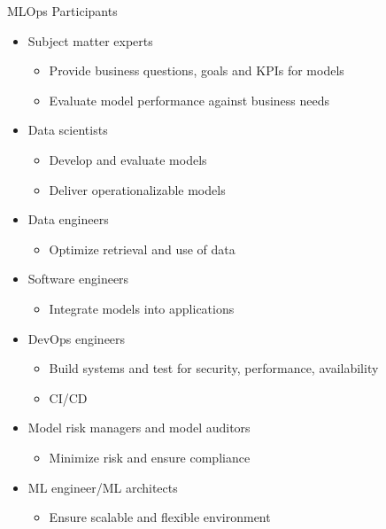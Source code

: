 \documentclass[ignorenonframetext,xcolor=x11names]{beamer}
\begin{document}
\begin{frame}[label=full]{MLOps Participants}
\begin{itemize}
  \item Subject matter experts
  \begin{itemize}
  \footnotesize
     \item Provide business questions, goals and KPIs for models
     \item Evaluate model performance against business needs
  \end{itemize}
  \item Data scientists
  \begin{itemize}
  \footnotesize
     \item Develop and evaluate models
     \item Deliver operationalizable models
  \end{itemize}
  \item Data engineers
  \begin{itemize}
  \footnotesize
      \item Optimize retrieval and use of data
  \end{itemize}
  \item Software engineers
  \begin{itemize}
  \footnotesize
      \item Integrate models into applications
  \end{itemize}
  \item DevOps engineers
  \begin{itemize}
  \footnotesize
     \item Build systems and test for security, performance, availability
     \item CI/CD
  \end{itemize}
  \item Model risk managers and model auditors
  \begin{itemize}
  \footnotesize
      \item Minimize risk and ensure compliance
  \end{itemize}
  \item ML engineer/ML architects
  \begin{itemize}
  \footnotesize
     \item Ensure scalable and flexible environment
  \end{itemize}
\end{itemize}
\end{frame}
\end{document}
